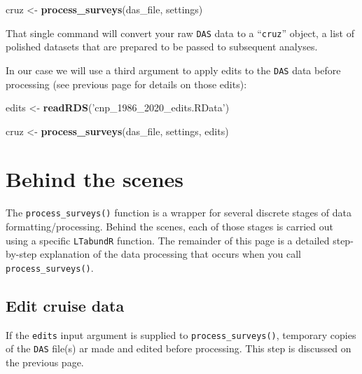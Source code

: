 \documentclass[
]{book}
\newenvironment{Shaded}{\begin{snugshade}}{\end{snugshade}}
\newcommand{\KeywordTok}[1]{\textcolor[rgb]{0.13,0.29,0.53}{\textbf{#1}}}
\newcommand{\NormalTok}[1]{#1}
\newcommand{\StringTok}[1]{\textcolor[rgb]{0.31,0.60,0.02}{#1}}
\begin{document}
\begin{Shaded}
\begin{Highlighting}[]
\NormalTok{cruz <-}\StringTok{ }\KeywordTok{process_surveys}\NormalTok{(das_file, }
\NormalTok{                        settings)}
\end{Highlighting}
\end{Shaded}

That single command will convert your raw \texttt{DAS} data to a ``\texttt{cruz}'' object, a list of polished datasets that are prepared to be passed to subsequent analyses.

In our case we will use a third argument to apply edits to the \texttt{DAS} data before processing (see previous page for details on those edits):

\begin{Shaded}
\begin{Highlighting}[]
\NormalTok{edits <-}\StringTok{ }\KeywordTok{readRDS}\NormalTok{(}\StringTok{'cnp_1986_2020_edits.RData'}\NormalTok{)}

\NormalTok{cruz <-}\StringTok{ }\KeywordTok{process_surveys}\NormalTok{(das_file, }
\NormalTok{                        settings,}
\NormalTok{                        edits)}
\end{Highlighting}
\end{Shaded}

\hypertarget{behind-the-scenes}{%
\section*{Behind the scenes}\label{behind-the-scenes}}

The \texttt{process\_surveys()} function is a wrapper for several discrete stages of data formatting/processing. Behind the scenes, each of those stages is carried out using a specific \texttt{LTabundR} function. The remainder of this page is a detailed step-by-step explanation of the data processing that occurs when you call \texttt{process\_surveys()}.

\hypertarget{edit-cruise-data}{%
\subsection*{Edit cruise data}\label{edit-cruise-data}}

If the \texttt{edits} input argument is supplied to \texttt{process\_surveys()}, temporary copies of the \texttt{DAS} file(s) ar made and edited before processing. This step is discussed on the previous page.
\end{document}
